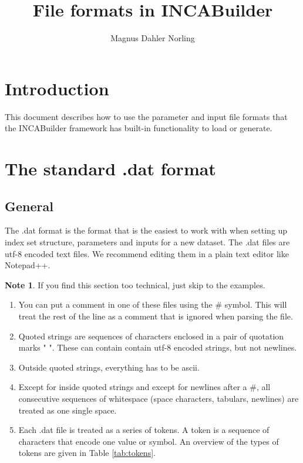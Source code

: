 \documentclass[11pt]{article}
\title{File formats in INCABuilder}
\author{Magnus Dahler Norling}
\theoremstyle{definition}
\newtheorem{mynote}{Note}
\newenvironment{note}%
  {\begin{lrbox}{\notebox}%
   \begin{minipage}{\dimexpr\linewidth-2\fboxsep}
   \begin{mynote}}%
  {\end{mynote}%
   \end{minipage}%
   \end{lrbox}%
   \begin{trivlist}
     \item[]\colorbox{silver}{\usebox\notebox}
   \end{trivlist}}
\begin{document}
\maketitle

\tableofcontents

\section{Introduction}

This document describes how to use the parameter and input file formats that the INCABuilder framework has built-in functionality to load or generate.

\section{The standard .dat format}

\subsection{General}
The .dat format is the format that is the easiest to work with when setting up index set structure, parameters and inputs for a new dataset. The .dat files are utf-8 encoded text files. We recommend editing them in a plain text editor like Notepad++.

\begin{note}
If you find this section too technical, just skip to the examples.
\end{note}

\begin{enumerate}[i]
\item You can put a comment in one of these files using the \# symbol. This will treat the rest of the line as a comment that is ignored when parsing the file.
\item Quoted strings are sequences of characters enclosed in a pair of quotation marks " ". These can contain contain utf-8 encoded strings, but not newlines.
\item Outside quoted strings, everything has to be ascii.
\item Except for inside quoted strings and except for newlines after a \#, all consecutive sequences of whitespace (space characters, tabulars, newlines) are treated as one single space.
\item Each .dat file is treated as a series of tokens. A token is a sequence of characters that encode one value or symbol. An overview of the types of tokens are given in Table \ref{tab:tokens}.
\end{enumerate}
\end{document}
